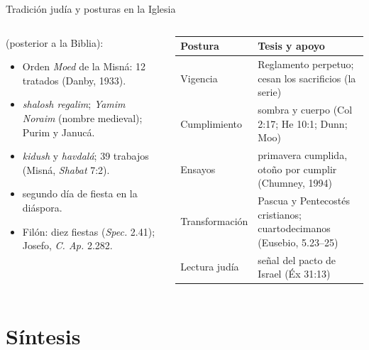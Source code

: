 \begin{frame}{Tradición judía y posturas en la Iglesia}
\begin{columns}[t,onlytextwidth]
\begin{column}{0.44\textwidth}\scriptsize
{} (posterior a la Biblia):
\begin{itemize}
\item Orden \emph{Moed} de la Misná: 12 tratados (Danby, 1933).
\item \emph{shalosh regalim}; \emph{Yamim Noraim} (nombre medieval); Purim y Janucá.
\item \emph{kidush} y \emph{havdalá}; 39 trabajos (Misná, \emph{Shabat} 7:2).
\item segundo día de fiesta en la diáspora.
\item Filón: diez fiestas (\emph{Spec.} 2.41); Josefo, \emph{C. Ap.} 2.282.
\end{itemize}
\end{column}
\begin{column}{0.54\textwidth}
\scriptsize\renewcommand{\arraystretch}{1.05}
\begin{tabular}{@{}L{2.0cm}L{4.4cm}@{}}
\toprule
\textbf{Postura} & \textbf{Tesis y apoyo} \\ \midrule
Vigencia & Reglamento perpetuo; cesan los sacrificios (la serie) \\
Cumplimiento & sombra y cuerpo (Col 2:17; He 10:1; Dunn; Moo) \\
Ensayos & primavera cumplida, otoño por cumplir (Chumney, 1994) \\
Transformación & Pascua y Pentecostés cristianos; cuartodecimanos (Eusebio, 5.23--25) \\
Lectura judía & señal del pacto de Israel (Éx 31:13) \\
\bottomrule
\end{tabular}
\end{column}
\end{columns}
\end{frame}

\section{Síntesis}


